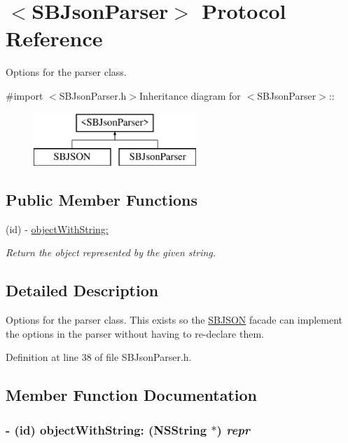 \hypertarget{protocol_s_b_json_parser-p}{
\section{$<$SBJsonParser$>$ Protocol Reference}
\label{protocol_s_b_json_parser-p}
}


Options for the parser class.  


{\ttfamily \#import $<$SBJsonParser.h$>$}Inheritance diagram for $<$SBJsonParser$>$::\begin{figure}[H]
\begin{center}
\leavevmode
\includegraphics[height=2cm]{protocol_s_b_json_parser-p}
\end{center}
\end{figure}
\subsection*{Public Member Functions}
\begin{DoxyCompactItemize}
\item 
(id) -\/ \hyperlink{protocol_s_b_json_parser-p_a5183c152f4a9e5e79bb9534fcbdf7bf6}{objectWithString:}
\begin{DoxyCompactList}\small\item\em Return the object represented by the given string. \item\end{DoxyCompactList}\end{DoxyCompactItemize}


\subsection{Detailed Description}
Options for the parser class. This exists so the \hyperlink{interface_s_b_j_s_o_n}{SBJSON} facade can implement the options in the parser without having to re-\/declare them. 

Definition at line 38 of file SBJsonParser.h.

\subsection{Member Function Documentation}
\hypertarget{protocol_s_b_json_parser-p_a5183c152f4a9e5e79bb9534fcbdf7bf6}{
\subsubsection[{objectWithString:}]{\setlength{\rightskip}{0pt plus 5cm}-\/ (id) objectWithString: ({\bf NSString} $\ast$) {\em repr}}}
\label{protocol_s_b_json_parser-p_a5183c152f4a9e5e79bb9534fcbdf7bf6}



